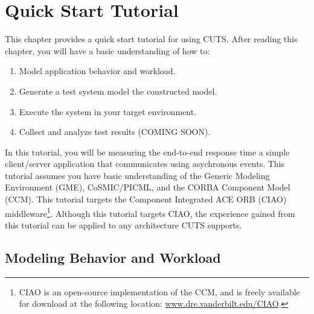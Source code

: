 
\chapter{Quick Start Tutorial}

This chapter provides a quick start tutorial for using CUTS. After reading this
chapter, you will have a basic understanding of how to:
\begin{enumerate}
  \item Model application behavior and workload.

  \item Generate a test system model the constructed model.

  \item Execute the system in your target environment.

  \item Collect and analyze test results (COMING SOON).
\end{enumerate}

In this tutorial, you will be measuring the end-to-end response time a simple
client/\-server application that communicates using asychronous events. This
tutorial assumes you have basic understanding of the Generic Modeling 
Environment (GME), CoSMIC/\-PICML, and the CORBA Component Model (CCM). This 
tutorial targets the Component Integrated ACE ORB (CIAO) middleware\footnote{CIAO
 is an open-source implementation of the CCM, and is freely available for download 
 at the following location: \url{www.dre.vanderbilt.edu/CIAO}.}.
Although this tutorial targets CIAO, the experience gained from
this tutorial can be applied to any architecture CUTS supports.

\section{Modeling Behavior and Workload}
\label{sec:quickstart-modeling}

